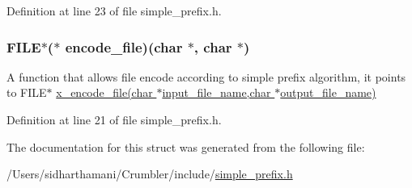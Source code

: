 Definition at line 23 of file simple\-\_\-prefix.\-h.

\hypertarget{structsimple__prefix_a73d0a239981b130553964b3839c20bdf}{
\subsubsection[{encode\-\_\-file}]{\setlength{\rightskip}{0pt plus 5cm}F\-I\-L\-E$\ast$($\ast$ encode\-\_\-file)(char $\ast$, char $\ast$)}}\label{structsimple__prefix_a73d0a239981b130553964b3839c20bdf}
A function that allows file encode according to simple prefix algorithm, it points to F\-I\-L\-E$\ast$ \hyperlink{simple__prefix_8c_aa71732b02f99cbdbee35eb443ec58501}{x\-\_\-encode\-\_\-file(char $\ast$input\-\_\-file\-\_\-name,char $\ast$output\-\_\-file\-\_\-name)} 

Definition at line 21 of file simple\-\_\-prefix.\-h.



The documentation for this struct was generated from the following file\-:\begin{DoxyCompactItemize}
\item 
/\-Users/sidharthamani/\-Crumbler/include/\hyperlink{simple__prefix_8h}{simple\-\_\-prefix.\-h}\end{DoxyCompactItemize}
